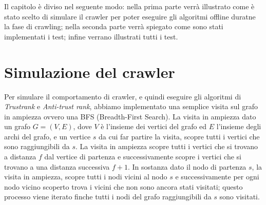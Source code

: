 Il capitolo è diviso nel seguente modo: nella prima parte verrà illustrato come è stato scelto di simulare il crawler per poter eseguire gli algoritmi offline duratne la fase di crawling; nella seconda parte verrà spiegato come sono stati implementati i test; infine verrano illustrati tutti i test.

\section{Simulazione del crawler}
Per simulare il comportamento di crawler, e quindi eseguire gli algoritmi di \textit{Trustrank} e \textit{Anti-trust rank}, abbiamo implementato una semplice visita sul grafo in ampiezza ovvero una BFS \cite{bfsCormen} (Breadth-First Search). La visita in ampiezza dato un grafo \(G=(V,E)\), dove \(V\) è l'insieme dei vertici del grafo ed \(E\) l'insieme degli archi del grafo, e un vertice \(s\) da cui far partire la visita, scopre tutti i vertici che sono raggiungibili da \(s\). La visita in ampiezza scopre tutti i vertici che si trovano a distanza \(f\) dal vertice di partenza e successivamente scopre i vertici che si trovano a una distanza successiva \(f+1\). In sostanza dato il nodo di partenza \(s\), la visita in ampiezza, scopre tutti i nodi vicini al nodo \(s\) e successivamente per ogni nodo vicino scoperto trova i vicini che non sono ancora stati visitati; questo processo viene iterato finche tutti i nodi del grafo raggiungibili da \(s\) sono visitati. 







